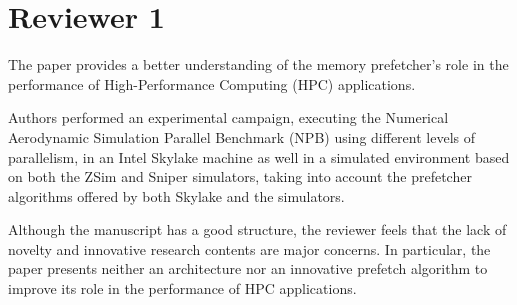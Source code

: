\documentclass{article}
\begin{document}
       
       
        





        


        
\section*{Reviewer 1}

The paper provides a better understanding of the memory prefetcher’s role in the performance of High-Performance Computing (HPC) applications.

Authors performed an experimental campaign, executing the Numerical Aerodynamic Simulation Parallel Benchmark (NPB) using different levels of parallelism, in an Intel Skylake machine as well in a simulated environment based on both the ZSim and Sniper simulators, taking into account the prefetcher algorithms offered by both Skylake and the simulators.

\vspace{.5cm} Although the manuscript has a good structure, the reviewer feels that the lack of novelty and innovative research contents are major concerns. In particular, the paper presents neither an architecture nor an innovative prefetch algorithm to improve its role in the performance of HPC applications. 
\end{document}
